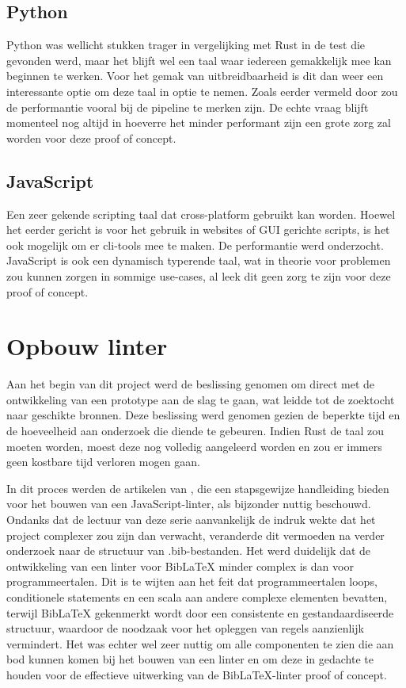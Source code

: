 \subsection{Python}
Python was wellicht stukken trager in vergelijking met Rust in de test die gevonden werd, maar het blijft wel een taal waar iedereen gemakkelijk mee kan beginnen te werken. Voor het gemak van uitbreidbaarheid is dit dan weer een interessante optie om deze taal in optie te nemen. Zoals eerder vermeld door \textcite{TurnerTrauring2023} zou de performantie vooral bij de pipeline te merken zijn.
De echte vraag blijft momenteel nog altijd in hoeverre het minder performant zijn een grote zorg zal worden voor deze proof of concept.

\subsection{JavaScript}
Een zeer gekende scripting taal dat cross-platform gebruikt kan worden. Hoewel het eerder gericht is voor het gebruik in websites of \acrshort{GUI} gerichte scripts, is het ook mogelijk om er cli-tools mee te maken. De performantie werd onderzocht. JavaScript is ook een dynamisch typerende taal, wat in theorie voor problemen zou kunnen zorgen in sommige use-cases, al leek dit geen zorg te zijn voor deze proof of concept\autocite{Simpson2023}.

\section{Opbouw linter}
Aan het begin van dit project werd de beslissing genomen om direct met de ontwikkeling van een prototype aan de slag te gaan, wat leidde tot de zoektocht naar geschikte bronnen. Deze beslissing werd genomen gezien de beperkte tijd en de hoeveelheid aan onderzoek die diende te gebeuren. Indien Rust de taal zou moeten worden, moest deze nog volledig aangeleerd worden en zou er immers geen kostbare tijd verloren mogen gaan.

In dit proces werden de artikelen van \textcite{BorgesLate2021}, die een stapsgewijze handleiding bieden voor het bouwen van een JavaScript-linter, als bijzonder nuttig beschouwd. Ondanks dat de lectuur van deze serie aanvankelijk de indruk wekte dat het project complexer zou zijn dan verwacht, veranderde dit vermoeden na verder onderzoek naar de structuur van .bib-bestanden. Het werd duidelijk dat de ontwikkeling van een linter voor BibLaTeX minder complex is dan voor programmeertalen. Dit is te wijten aan het feit dat programmeertalen loops, conditionele statements en een scala aan andere complexe elementen bevatten, terwijl BibLaTeX gekenmerkt wordt door een consistente en gestandaardiseerde structuur, waardoor de noodzaak voor het opleggen van regels aanzienlijk vermindert. Het was echter wel zeer nuttig om alle componenten te zien die aan bod kunnen komen bij het bouwen van een linter en om deze in gedachte te houden voor de effectieve uitwerking van de BibLaTeX-linter proof of concept.

